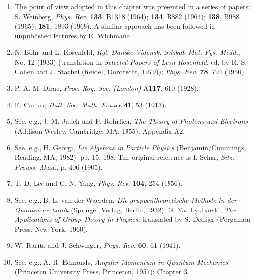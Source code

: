 \begin{enumerate}
\item\label{ref:5.1} The point of view adopted in this chapter was presented in a series of
papers: S. Weinberg, \emph{Phys. Rev.} \textbf{133}, B1318 (1964);
\textbf{134}, B882 (1964); \textbf{138}, B988 (1965); \textbf{181}, 1893
(1969). A similar approach has been followed in unpublished lectures by
E. Wichmann.

\item\label{ref:5.2} N. Bohr and L. Rosenfeld, \emph{Kgl. Danske Vidensk. Selskab Mat.-Fys.
Medd.}, No. 12 (1933) (translation in \emph{Selected Papers of Leon
Rosenfeld}, ed. by R. S. Cohen and J. Stachel (Reidel, Dordrecht, 1979));
\emph{Phys. Rev.} \textbf{78}, 794 (1950).

\item\label{ref:5.3} P. A. M. Dirac, \emph{Proc. Roy. Soc. (London)} A\textbf{117}, 610
(1928).

\item\label{ref:5.4} E. Cartan, \emph{Bull. Soc. Math. France} \textbf{41}, 53 (1913).

\item\label{ref:5.5} See, e.g., J. M. Jauch and F. Rohrlich, \emph{The Theory of Photons and
Electrons} (Addison-Wesley, Cambridge, MA, 1955): Appendix A2.

\item\label{ref:5.6} See, e.g., H. Georgi, \emph{Lie Algebras in Particle Physics}
(Benjamin/Cummings, Reading, MA, 1982): pp. 15, 198. The original reference
is I. Schur, \emph{Sitz. Preuss. Akad.}, p. 406 (1905).

\item\label{ref:5.7} T. D. Lee and C. N. Yang, \emph{Phys. Rev.} \textbf{104}, 254 (1956).

\item\label{ref:5.8} See, e.g., B. L. van der Waerden, \emph{Die gruppentheoretische Methode
in der Quantenmechanik} (Springer Verlag, Berlin, 1932); G. Ya. Lyubarski,
\emph{The Applications of Group Theory in Physics}, translated by S. Dedijer
(Pergamon Press, New York, 1960).

\item\label{ref:5.9} W. Rarita and J. Schwinger, \emph{Phys. Rev.} \textbf{60}, 61 (1941).

\item\label{ref:5.10} See, e.g., A. R. Edmonds, \emph{Angular Momentum in Quantum Mechanics}
(Princeton University Press, Princeton, 1957): Chapter 3.


\end{enumerate}
